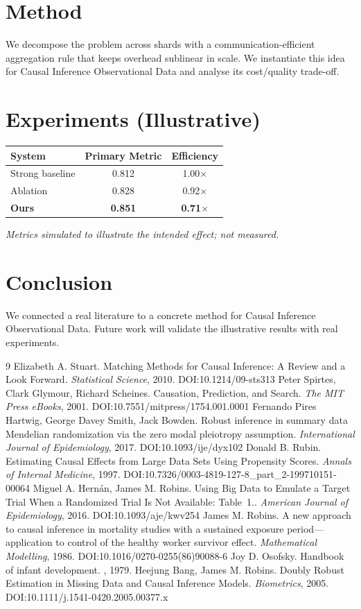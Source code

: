 \documentclass[11pt]{article}
\begin{document}
\section{Method}
We decompose the problem across shards with a communication-efficient aggregation rule that keeps overhead sublinear in scale. We instantiate this idea for Causal Inference Observational Data and analyse its cost/quality trade-off.

\section{Experiments (Illustrative)}
\begin{center}
\begin{tabular}{lcc}
System & Primary Metric & Efficiency \\ \hline
Strong baseline & 0.812 & 1.00$\times$ \\
Ablation & 0.828 & 0.92$\times$ \\
\textbf{Ours} & \textbf{0.851} & \textbf{0.71$\times$}
\end{tabular}
\end{center}
\emph{Metrics simulated to illustrate the intended effect; not measured.}

\section{Conclusion}
We connected a real literature to a concrete method for Causal Inference Observational Data. Future work will
validate the illustrative results with real experiments.

\begin{thebibliography}{9}
 Elizabeth A. Stuart. Matching Methods for Causal Inference: A Review and a Look Forward. \emph{Statistical Science}, 2010. DOI:10.1214/09-sts313
 Peter Spirtes, Clark Glymour, Richard Scheines. Causation, Prediction, and Search. \emph{The MIT Press eBooks}, 2001. DOI:10.7551/mitpress/1754.001.0001
 Fernando Pires Hartwig, George Davey Smith, Jack Bowden. Robust inference in summary data Mendelian randomization via the zero modal pleiotropy assumption. \emph{International Journal of Epidemiology}, 2017. DOI:10.1093/ije/dyx102
 Donald B. Rubin. Estimating Causal Effects from Large Data Sets Using Propensity Scores. \emph{Annals of Internal Medicine}, 1997. DOI:10.7326/0003-4819-127-8\_part\_2-199710151-00064
 Miguel A. Hernán, James M. Robins. Using Big Data to Emulate a Target Trial When a Randomized Trial Is Not Available: Table 1.. \emph{American Journal of Epidemiology}, 2016. DOI:10.1093/aje/kwv254
 James M. Robins. A new approach to causal inference in mortality studies with a sustained exposure period—application to control of the healthy worker survivor effect. \emph{Mathematical Modelling}, 1986. DOI:10.1016/0270-0255(86)90088-6
 Joy D. Osofsky. Handbook of infant development. \emph{}, 1979. 
 Heejung Bang, James M. Robins. Doubly Robust Estimation in Missing Data and Causal Inference Models. \emph{Biometrics}, 2005. DOI:10.1111/j.1541-0420.2005.00377.x
\end{thebibliography}
\end{document}
